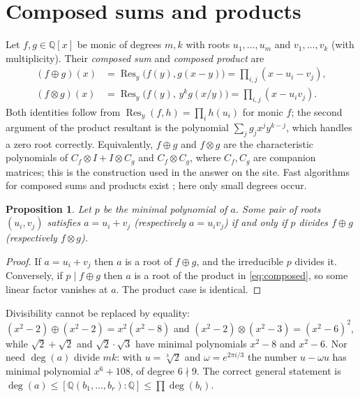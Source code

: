 \documentclass[11pt,a4paper]{article}
\newtheorem{proposition}[theorem]{Proposition}
\theoremstyle{definition}
\theoremstyle{remark}
\newcommand{\Q}{\mathbb{Q}}
\newcommand{\Res}{\operatorname{Res}}
\newcommand{\dg}{\deg}
\begin{document}
\section{Composed sums and products}\label{sec:resultants}

Let $f,g\in\Q[x]$ be monic of degrees $m,k$ with roots $u_1,\dots,u_m$ and $v_1,\dots,v_k$ (with
multiplicity).  Their \emph{composed sum} and \emph{composed product} are
\begin{equation}\label{eq:composed}
\begin{aligned}
 (f\oplus g)(x)&=\Res_y\bigl(f(y),g(x-y)\bigr)=\prod_{i,j}(x-u_i-v_j),\\
 (f\otimes g)(x)&=\Res_y\bigl(f(y),\,y^k g(x/y)\bigr)=\prod_{i,j}(x-u_iv_j).
\end{aligned}
\end{equation}
Both identities follow from $\Res_y(f,h)=\prod_i h(u_i)$ for monic $f$; the second argument of the
product resultant is the polynomial $\sum_j g_jx^jy^{k-j}$, which handles a zero root correctly.
Equivalently, $f\oplus g$ and $f\otimes g$ are the characteristic polynomials of $C_f\otimes I+I\otimes
C_g$ and $C_f\otimes C_g$, where $C_f,C_g$ are companion matrices; this is the construction used in the
answer on the site.  Fast algorithms for composed sums and products exist \cite{BFSS}; here only small
degrees occur.

\begin{proposition}\label{prop:divides}
Let $p$ be the minimal polynomial of $a$.  Some pair of roots $(u_i,v_j)$ satisfies $a=u_i+v_j$
(respectively $a=u_iv_j$) if and only if $p$ divides $f\oplus g$ (respectively $f\otimes g$).
\end{proposition}

\begin{proof}
If $a=u_i+v_j$ then $a$ is a root of $f\oplus g$, and the irreducible $p$ divides it.  Conversely, if
$p\mid f\oplus g$ then $a$ is a root of the product in \eqref{eq:composed}, so some linear factor
vanishes at $a$.  The product case is identical.
\end{proof}

Divisibility cannot be replaced by equality: $(x^2-2)\oplus(x^2-2)=x^2(x^2-8)$ and
$(x^2-2)\otimes(x^2-3)=(x^2-6)^2$, while $\sqrt2+\sqrt2$ and $\sqrt2\cdot\sqrt3$ have minimal
polynomials $x^2-8$ and $x^2-6$.  Nor need $\dg(a)$ divide $mk$: with $u=\sqrt[3]{2}$ and
$\omega=e^{2\pi i/3}$ the number $u-\omega u$ has minimal polynomial $x^6+108$, of degree $6\nmid9$.
The correct general statement is $\dg(a)\le[\Q(b_1,\dots,b_r):\Q]\le\prod\dg(b_i)$.
\end{document}
